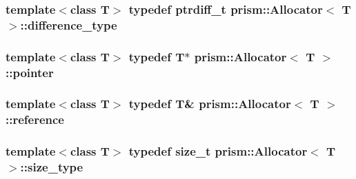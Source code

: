 \subsubsection[{\texorpdfstring{difference\+\_\+type}{difference_type}}]{\setlength{\rightskip}{0pt plus 5cm}template$<$class T$>$ typedef ptrdiff\+\_\+t {\bf prism\+::\+Allocator}$<$ T $>$\+::{\bf difference\+\_\+type}}\hypertarget{classprism_1_1_allocator_a1769ae6e60e970a4d30ee15275f7ac6d}{}\label{classprism_1_1_allocator_a1769ae6e60e970a4d30ee15275f7ac6d}
\subsubsection[{\texorpdfstring{pointer}{pointer}}]{\setlength{\rightskip}{0pt plus 5cm}template$<$class T$>$ typedef T$\ast$ {\bf prism\+::\+Allocator}$<$ T $>$\+::{\bf pointer}}\hypertarget{classprism_1_1_allocator_ad3c6706a7243bd3ef489e16d34d5750f}{}\label{classprism_1_1_allocator_ad3c6706a7243bd3ef489e16d34d5750f}
\subsubsection[{\texorpdfstring{reference}{reference}}]{\setlength{\rightskip}{0pt plus 5cm}template$<$class T$>$ typedef T\& {\bf prism\+::\+Allocator}$<$ T $>$\+::{\bf reference}}\hypertarget{classprism_1_1_allocator_a5dde9876d2ed0ca292d8a2019ac2836f}{}\label{classprism_1_1_allocator_a5dde9876d2ed0ca292d8a2019ac2836f}
\subsubsection[{\texorpdfstring{size\+\_\+type}{size_type}}]{\setlength{\rightskip}{0pt plus 5cm}template$<$class T$>$ typedef size\+\_\+t {\bf prism\+::\+Allocator}$<$ T $>$\+::{\bf size\+\_\+type}}\hypertarget{classprism_1_1_allocator_a47cb9435e4e9ff4c934ea3d4b4338d52}{}\label{classprism_1_1_allocator_a47cb9435e4e9ff4c934ea3d4b4338d52}
